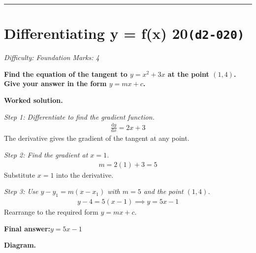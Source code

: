 \documentclass[11pt]{article}
\newcommand{\question}[1]{\par\medskip\noindent\textbf{#1}\par}
\begin{document}
\medskip\hrule

\section*{Differentiating y = f(x) 20\quad\small\texttt{(d2-020)}}
\textit{Difficulty: Foundation \quad\textbar\quad Marks: 4}

\question{Find the equation of the tangent to \( y = x^2 + 3x \) at the point \( (1, 4) \). Give your answer in the form \( y = mx + c \).}

\textbf{Worked solution.}

\textit{Step 1: Differentiate to find the gradient function.}
\[\begin{gathered}
\frac{\mathrm{d}y}{\mathrm{d}x} = 2x + 3
\end{gathered}\]
The derivative gives the gradient of the tangent at any point.

\textit{Step 2: Find the gradient at \( x = 1 \).}
\[\begin{gathered}
m = 2(1) + 3 = 5
\end{gathered}\]
Substitute \( x = 1 \) into the derivative.

\textit{Step 3: Use \( y - y_1 = m(x - x_1) \) with \( m = 5 \) and the point \( (1, 4) \).}
\[\begin{gathered}
y - 4 = 5(x - 1) \implies y = 5x - 1
\end{gathered}\]
Rearrange to the required form \( y = mx + c \).

\begin{answerbox}
\textbf{Final answer:}\quad \(\displaystyle  y = 5x - 1 \)
\end{answerbox}
\textbf{Diagram.}
\end{document}
